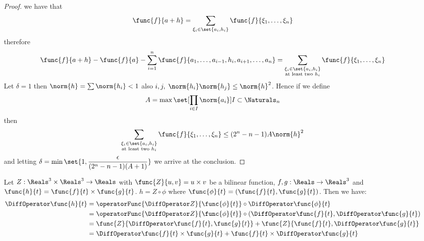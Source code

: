 \begin{proof}
    we have that
    \begin{equation*}
        \func{f}{a + h} = \sum_{\xi_i \in \set{a_i,h_i}} \func{f}{\xi_1, \dots , \xi_n}
    \end{equation*}
    therefore
    \begin{equation*}
        \func{f}{a + h} - \func{f}{a} - \sum_{i = 1}^{n} \func{f}{a_1, \dots, a_{i-1}, h_i, a_{i+1}, \dots , a_n} = \sum_{\substack{\xi_i \in \set{a_i,h_i} \\ \text{at least two \(h_i\)}}} \func{f}{\xi_1, \dots , \xi_n}
    \end{equation*}
    Let \(\delta = 1\) then  \(\norm{h} = \sum \norm{h_i} < 1\) also \(i,j, \; \norm{h_i}\norm{h_j} \leq \norm{h}^2\). Hence if we define
    \begin{equation*}
        A = \max \set[\prod_{i \in I} {\norm{a_i}}]{I \subset \Naturals_n}
    \end{equation*}
    then
    \begin{equation*}
        \sum_{\substack{\xi_i \in \set{a_i,h_i} \\ \text{at least two \(h_i\)}}} \func{f}{\xi_1, \dots , \xi_n} \leq (2^n - n - 1)A \norm{h}^2
    \end{equation*}
    and letting \(\delta = \min \set{1 , \dfrac{\epsilon}{(2^n - n - 1)(A + 1)}}\) we arrive at the conclusion.
\end{proof}

\begin{example}
    Let \(Z: \Reals^3 \times \Reals^3 \to \Reals\) with \(\func{Z}{u,v}= u \times v\) be a bilinear function, \(f,g: \Reals \to \Reals^3\) and \(\func{h}{t} = \func{f}{t} \times \func{g}{t}\). \(h = Z \circ \phi\) where \(\func{\phi}{t} = (\func{f}{t},\func{g}{t})\). Then we have:
    \begin{align*}
        \DiffOperator \func{h}{t} & = \operatorFunc{\DiffOperator Z}{\func{\phi}{t}}\circ \DiffOperator \func{\phi}{t}                             \\
                                  & =  \operatorFunc{\DiffOperator Z}{\func{\phi}{t}} \circ (\DiffOperator \func{f}{t}, \DiffOperator \func{g}{t}) \\
                                  & = \func{Z}{\DiffOperator \func{f}{t}, \func{g}{t}} + \func{Z}{ \func{f}{t}, \DiffOperator \func{g}{t}}         \\
                                  & = \DiffOperator \func{f}{t} \times \func{g}{t} + \func{f}{t} \times \DiffOperator \func{g}{t}
    \end{align*}
\end{example}

